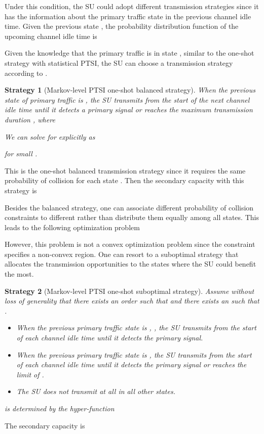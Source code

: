 \documentclass[10pt,final,journal,letterpaper]{IEEEtran}
\newtheorem{strategy}{Strategy}
\begin{document}
\par
Under this condition, the SU could adopt different transmission strategies since it has the information about the primary traffic state in the previous channel idle time. Given the previous state , the probability distribution function of the upcoming channel idle time is

Given the knowledge that the primary traffic is in state , similar to the one-shot strategy with statistical PTSI, the SU can choose a transmission strategy according to .
\begin{strategy}[Markov-level PTSI one-shot balanced strategy]
When the previous state of primary traffic is , the SU transmits from the start of the next channel idle time until it detects a primary signal or reaches the maximum transmission duration , where

We can solve for  explicitly as

for small .
\end{strategy}
This is the one-shot balanced transmission strategy since it requires the same probability of collision for each state . Then the secondary capacity with this strategy is


\par
Besides the balanced strategy, one can associate different probability of collision constraints to different  rather than distribute them equally among all states. This leads to the following optimization problem

However, this problem is not a convex optimization problem since the constraint specifies a non-convex region. One can resort to a suboptimal strategy that allocates the transmission opportunities to the states where the SU could benefit the most.
\begin{strategy}[Markov-level PTSI one-shot suboptimal strategy]
Assume without loss of generality that there exists an order  such that  and there exists an  such that .
\begin{itemize}
  \item When the previous primary traffic state is , , the SU transmits from the start of each channel idle time until it detects the primary signal.
  \item When the previous primary traffic state is , the SU transmits from the start of each channel idle time until it detects the primary signal or reaches the limit of .
  \item The SU does not transmit at all in all other states.
\end{itemize}
 is determined by the hyper-function

\end{strategy}
The secondary capacity is
\end{document}
